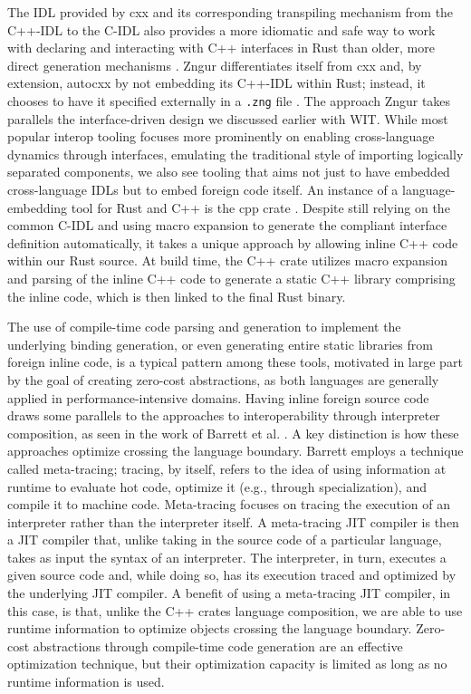The IDL provided by cxx and its corresponding transpiling mechanism from the C++-IDL to the C-IDL also provides a more idiomatic and safe way to work with declaring and interacting with C++ interfaces in Rust than older, more direct generation mechanisms \cite{chromium-rust-cpp-interop}. Zngur differentiates itself from cxx and, by extension, autocxx by not embedding its C++-IDL within Rust; instead, it chooses to have it specified externally in a \texttt{.zng} file \cite{zngur_philosophy}. The approach Zngur takes parallels the interface-driven design we discussed earlier with WIT. While most popular interop tooling focuses more prominently on enabling cross-language dynamics through interfaces, emulating the traditional style of importing logically separated components, we also see tooling that aims not just to have embedded cross-language IDLs but to embed foreign code itself. An instance of a language-embedding tool for Rust and C++ is the cpp crate \cite{Goffart2024mystor}. Despite still relying on the common C-IDL and using macro expansion to generate the compliant interface definition automatically, it takes a unique approach by allowing inline C++ code within our Rust source. At build time, the C++ crate utilizes macro expansion and parsing of the inline C++ code to generate a static C++ library comprising the inline code, which is then linked to the final Rust binary. 

The use of compile-time code parsing and generation to implement the underlying binding generation, or even generating entire static libraries from foreign inline code, is a typical pattern among these tools, motivated in large part by the goal of creating zero-cost abstractions, as both languages are generally applied in performance-intensive domains. Having inline foreign source code draws some parallels to the approaches to interoperability through interpreter composition, as seen in the work of Barrett et al. \cite{Barrett2015}. A key distinction is how these approaches optimize crossing the language boundary. Barrett employs a technique called meta-tracing; tracing, by itself, refers to the idea of using information at runtime to evaluate hot code, optimize it (e.g., through specialization), and compile it to machine code. Meta-tracing focuses on tracing the execution of an interpreter rather than the interpreter itself. A meta-tracing JIT compiler is then a JIT compiler that, unlike taking in the source code of a particular language, takes as input the syntax of an interpreter. The interpreter, in turn, executes a given source code and, while doing so, has its execution traced and optimized by the underlying JIT compiler. A benefit of using a meta-tracing JIT compiler, in this case, is that, unlike the C++ crates language composition, we are able to use runtime information to optimize objects crossing the language boundary. Zero-cost abstractions through compile-time code generation are an effective optimization technique, but their optimization capacity is limited as long as no runtime information is used.

